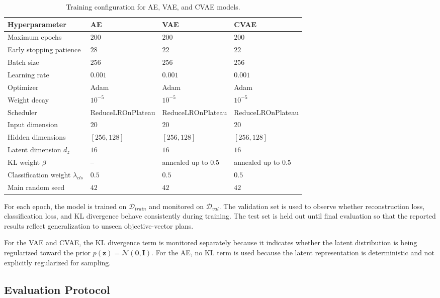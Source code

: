 \begin{table}[H]
\centering
\caption{Training configuration for AE, VAE, and CVAE models.}
\label{tab:training_configuration}
\begin{tabularx}{\textwidth}{lXXX}
\hline
\textbf{Hyperparameter} & \textbf{AE} & \textbf{VAE} & \textbf{CVAE} \\
\hline
Maximum epochs & $200$ & $200$ & $200$ \\
Early stopping patience & $28$ & $22$ & $22$ \\
Batch size & $256$ & $256$ & $256$ \\
Learning rate & $0.001$ & $0.001$ & $0.001$ \\
Optimizer & Adam & Adam & Adam \\
Weight decay & $10^{-5}$ & $10^{-5}$ & $10^{-5}$ \\
Scheduler & ReduceLROnPlateau & ReduceLROnPlateau & ReduceLROnPlateau \\
Input dimension & $20$ & $20$ & $20$ \\
Hidden dimensions & $[256,128]$ & $[256,128]$ & $[256,128]$ \\
Latent dimension $d_z$ & $16$ & $16$ & $16$ \\
KL weight $\beta$ & -- & annealed up to $0.5$ & annealed up to $0.5$ \\
Classification weight $\lambda_{cls}$ & $0.5$ & $0.5$ & $0.5$ \\
Main random seed & $42$ & $42$ & $42$ \\
\hline
\end{tabularx}
\end{table}

For each epoch, the model is trained on $\mathcal{D}_{train}$ and monitored on $\mathcal{D}_{val}$. The validation set is used to observe whether reconstruction loss, classification loss, and KL divergence behave consistently during training. The test set is held out until final evaluation so that the reported results reflect generalization to unseen objective-vector plans.

For the VAE and CVAE, the KL divergence term is monitored separately because it indicates whether the latent distribution is being regularized toward the prior $p(\mathbf{z})=\mathcal{N}(\mathbf{0},\mathbf{I})$. For the AE, no KL term is used because the latent representation is deterministic and not explicitly regularized for sampling.

\subsection{Evaluation Protocol}
\label{subsec:evaluation_protocol}

